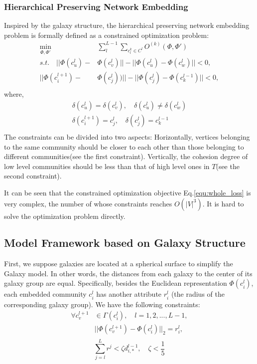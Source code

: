 \documentclass{article}
\theoremstyle{definition}
\begin{document}
	 \subsubsection{Hierarchical Preserving Network Embedding}
	 Inspired by the galaxy structure, the hierarchical preserving network embedding problem is formally defined as a constrained optimization problem:
			\begin{equation}
			\label{equ:whole_loss}
			\begin{split}
			\min_{\Phi,\Phi'} & \sum_l^{L-1}\sum_{c^k_l \in C^l} O^{(k)}(\Phi, \Phi') \\
			s.t. \quad
			|| \Phi(c_u^l) - & \Phi(c_v^l) || - ||\Phi(c_u^l) - \Phi(c_w^l)|| < 0, \\
			|| \Phi(c_i^{l+1}) - & \Phi(c_j^{l})) || - ||\Phi(c_j^{l}) - \Phi(c_k^{l - 1})|| < 0,\\
			\end{split}
			\end{equation}
			where,
			\[
			\begin{split}
				\delta(c_u^l) = \delta(c_v^l), \quad \delta(c_u^l) \neq \delta(c_w^l)\\
				\delta(c_i^{l+1}) = c^l_j, \quad \delta(c^l_j) = c^{l - 1}_k \\ 
			\end{split}
			\]
		The constraints can be divided into two aspects: Horizontally, vertices belonging to the same community should be closer to each other than those belonging to different communities(see the first constraint). 
		Vertically, the cohesion degree of low level communities should be less than that of high level ones in $T$(see the second constraint). 
	
	It can be seen that the constrained optimization objective Eq.\ref{equ:whole_loss} is very complex, the number of whose constraints reaches $O (|V|^3) $. It is hard to solve the optimization problem directly.

	 \subsection{Model Framework based on Galaxy Structure}
	 First, we suppose galaxies are located at a spherical surface to simplify the Galaxy model. In other words, the distances from each galaxy to the center of its galaxy group are equal. Specifically, besides the Euclidean representation $\Phi(c_i^l)$, each embedded community $c_i^l$ has another attribute $r_i^l$ (the radius of the corresponding galaxy group).
	 We have the following constraints:
	 \begin{equation}
	 \begin{split}
	 	\label{equ:sphere_constraints}
	 	\forall c_v^{l+1} & \in \Gamma(c_i^l), \quad l = 1, 2, ..., L - 1,\\
	 	& ||\Phi(c_v^{l+1})  - \Phi(c_i^l)||_2= r_i^l, \\	
	 \end{split}
	 \end{equation}
	 \begin{equation}
	 	\label{equ:galaxy_constraints}
	 	\sum_{j=l}^L r^j < \zeta d_{i, *}^{l-1}, \quad \zeta < \frac{1}{5}
	 \end{equation}
\end{document}
